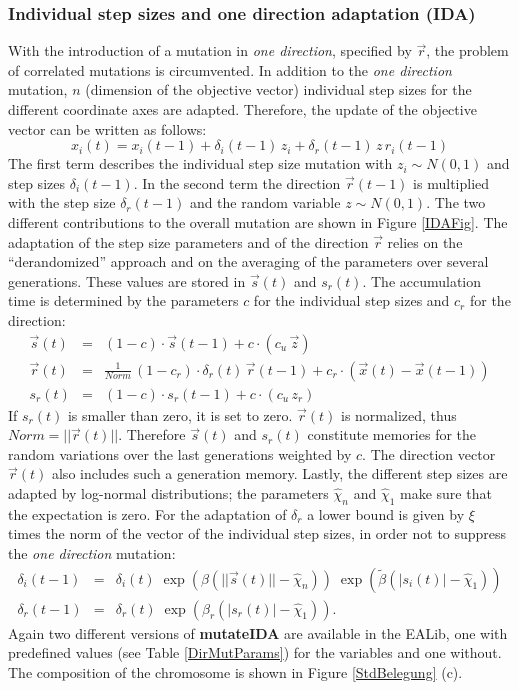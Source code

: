 \subsubsection{Individual step sizes and one direction adaptation (IDA)}
\label{ss:IndDir}
With the introduction of a mutation in {\em one direction}, specified 
by $\vec{r}$, the problem of correlated mutations is circumvented. In
addition to the {\em one direction} mutation, $n$ (dimension of
the objective vector) individual step sizes for the different
coordinate axes are adapted. Therefore, the update of the objective vector
can be written as follows:
\begin{equation}
\label{IDAadap}
x_i(t) = x_i(t-1) + \delta_i(t-1)\,z_i + \delta_r(t-1)\,z\,r_i(t-1)
\end{equation}
The first term describes the individual step size mutation with
$z_i \sim N(0,1)$ and step sizes $\delta_i(t-1)$. In the second
term the direction $\vec{r}(t-1)$ is multiplied with the step
size $\delta_r(t-1)$ and the random variable $z \sim N(0,1)$.
The two different contributions to the overall mutation are shown 
in Figure \ref{IDAFig}. The adaptation of the step size parameters
and of the direction $\vec{r}$ relies on the ``derandomized'' approach and
on the averaging of the parameters over several generations. These
values are stored in $\vec{s}(t)$ and $s_r(t)$. The
accumulation time is determined by the parameters $c$ for the 
individual step sizes and $c_r$ for the direction:
\begin{eqnarray}
\vec{s}(t) & = & (1-c) \cdot \vec{s}(t-1) + c \cdot (c_u\,\vec{z})\\
\vec{r}(t) & = & \frac{1}{Norm} \,
                 (1-c_r) \cdot \delta_r(t)\, \vec{r}(t-1) + 
                 c_r \cdot (\vec{x}(t)-\vec{x}(t-1))\\
s_r(t)     & = & (1-c) \cdot s_r(t-1) + c \cdot (c_u\,z_r)
\end{eqnarray}
If $s_r(t)$ is smaller than zero, it is set to zero. $\vec{r}(t)$ is
normalized, thus $Norm=||\vec{r}(t)||$. Therefore $\vec{s}(t)$ and
$s_r(t)$ constitute memories for the random variations over the last
generations weighted by $c$. The direction vector $\vec{r}(t)$ also
includes such a generation memory. Lastly, the different step sizes
are adapted by log-normal distributions; the parameters 
$\hat{\chi}_n$ and $\hat{\chi}_1$ make sure that the expectation is
zero. For the adaptation of $\delta_r$ a lower bound is given by $\xi$
times the norm of the vector of the individual step sizes, in order not
to suppress the {\em one direction} mutation:
\begin{eqnarray}
\delta_i(t-1) & = &\delta_i(t)\;
\exp\left(\beta\left(||\vec{s}(t)||-\hat{\chi}_n\right)\right)\;
\exp\left({\tilde \beta}\left(|s_i(t)|-\hat{\chi}_1\right)\right)\\
\delta_r(t-1) & = &\delta_r(t)\;
\exp\left({\beta_r}\left(|s_r(t)|-\hat{\chi}_1\right)\right).
\end{eqnarray}
Again two different versions of {\sffamily\bfseries\small
  mutateIDA} are available in the EALib, one with predefined
values (see Table \ref{DirMutParams}) for the variables and one
  without. The composition of
the chromosome is shown in Figure \ref{StdBelegung} (c).

